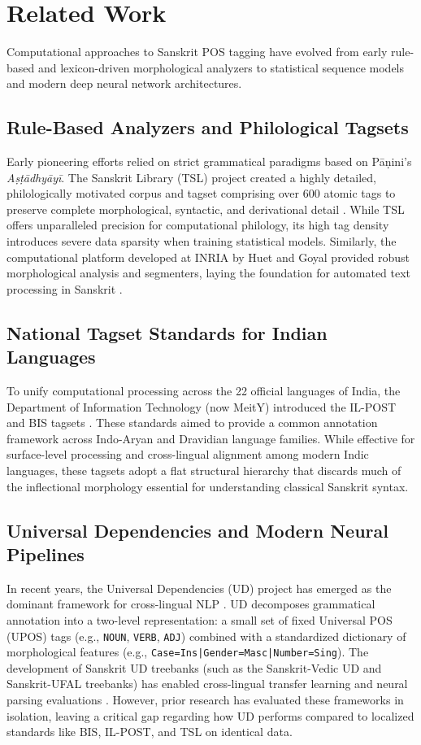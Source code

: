 \documentclass[11pt,a4paper]{article}
\begin{document}
\section{Related Work}

Computational approaches to Sanskrit POS tagging have evolved from early rule-based and lexicon-driven morphological analyzers to statistical sequence models and modern deep neural network architectures.

\subsection{Rule-Based Analyzers and Philological Tagsets}
Early pioneering efforts relied on strict grammatical paradigms based on P\=a\d{n}ini's \textit{A\d{s}\d{t}\=adhy\=ay\=i}. The Sanskrit Library (TSL) project created a highly detailed, philologically motivated corpus and tagset comprising over 600 atomic tags to preserve complete morphological, syntactic, and derivational detail \cite{scharf2011}. While TSL offers unparalleled precision for computational philology, its high tag density introduces severe data sparsity when training statistical models. Similarly, the computational platform developed at INRIA by Huet and Goyal provided robust morphological analysis and segmenters, laying the foundation for automated text processing in Sanskrit \cite{goyal2016}.

\subsection{National Tagset Standards for Indian Languages}
To unify computational processing across the 22 official languages of India, the Department of Information Technology (now MeitY) introduced the IL-POST and BIS tagsets \cite{tdil2011}. These standards aimed to provide a common annotation framework across Indo-Aryan and Dravidian language families. While effective for surface-level processing and cross-lingual alignment among modern Indic languages, these tagsets adopt a flat structural hierarchy that discards much of the inflectional morphology essential for understanding classical Sanskrit syntax.

\subsection{Universal Dependencies and Modern Neural Pipelines}
In recent years, the Universal Dependencies (UD) project has emerged as the dominant framework for cross-lingual NLP \cite{nivre2020}. UD decomposes grammatical annotation into a two-level representation: a small set of fixed Universal POS (UPOS) tags (e.g., \texttt{NOUN}, \texttt{VERB}, \texttt{ADJ}) combined with a standardized dictionary of morphological features (e.g., \texttt{Case=Ins|Gender=Masc|Number=Sing}). The development of Sanskrit UD treebanks (such as the Sanskrit-Vedic UD and Sanskrit-UFAL treebanks) has enabled cross-lingual transfer learning and neural parsing evaluations \cite{hellwig2015}. However, prior research has evaluated these frameworks in isolation, leaving a critical gap regarding how UD performs compared to localized standards like BIS, IL-POST, and TSL on identical data.
\end{document}
